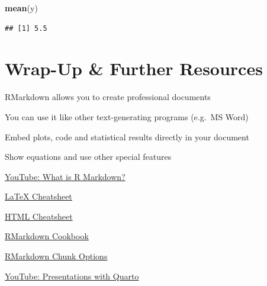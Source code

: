\documentclass[
]{book}
\newenvironment{Shaded}{\begin{snugshade}}{\end{snugshade}}
\newcommand{\FunctionTok}[1]{\textcolor[rgb]{0.13,0.29,0.53}{\textbf{#1}}}
\newcommand{\NormalTok}[1]{#1}
\begin{document}
\begin{Shaded}
\begin{Highlighting}[]
\FunctionTok{mean}\NormalTok{(y)}
\end{Highlighting}
\end{Shaded}

\begin{verbatim}
## [1] 5.5
\end{verbatim}

\section{Wrap-Up \& Further Resources}\label{wrap-up-further-resources-8}

RMarkdown allows you to create professional documents

You can use it like other text-generating programs (e.g.~MS Word)

Embed plots, code and statistical results directly in your document

Show equations and use other special features

\href{https://www.youtube.com/watch?v=asHhuHRxhvo&ab_channel=EquitableEquations/}{YouTube: What is R Markdown?}

\href{https://wch.github.io/latexsheet/}{LaTeX Cheatsheet}

\href{https://web.stanford.edu/group/csp/cs21/htmlcheatsheet.pdf}{HTML Cheatsheet}

\href{https://bookdown.org/yihui/rmarkdown-cookbook/}{RMarkdown Cookbook}

\href{https://yihui.org/knitr/options/}{RMarkdown Chunk Options}

\href{https://www.youtube.com/watch?v=01KifhHDkFk&ab_channel=EquitableEquations}{YouTube: Presentations with Quarto}
\end{document}
